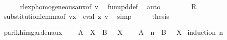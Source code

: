 \begin{isabellebody}
\ \ \ \ \isamarkupfalse%
\ rlexp{\isacharunderscore}{\kern0pt}homogeneous{\isacharunderscore}{\kern0pt}aux{\isacharbrackleft}{\kern0pt}of\ {\isacharquery}{\kern0pt}v{\isacharprime}{\kern0pt}{\isacharbrackright}{\kern0pt}\ \isamarkupfalse%
\ fun{\isacharunderscore}{\kern0pt}upd{\isacharunderscore}{\kern0pt}def\ \isamarkupfalse%
\ auto\isanewline
\ \ \isamarkupfalse%
\ \isamarkupfalse%
\ {\isachardoublequoteopen}{\isasymdots}\ {\isacharequal}{\kern0pt}\ {\isasymPsi}\ {\isacharquery}{\kern0pt}R{\isachardoublequoteclose}\ \isamarkupfalse%
\ substitution{\isacharunderscore}{\kern0pt}lemma{\isacharbrackleft}{\kern0pt}of\ {\isachardoublequoteopen}v{\isacharparenleft}{\kern0pt}x\ {\isacharcolon}{\kern0pt}{\isacharequal}{\kern0pt}\ eval\ z\ v{\isacharparenright}{\kern0pt}{\isachardoublequoteclose}{\isacharbrackright}{\kern0pt}\ \isamarkupfalse%
\ simp\isanewline
\ \ \isamarkupfalse%
\ \isamarkupfalse%
\ {\isacharquery}{\kern0pt}thesis\ \isakeywordONE{{\isachardot}{\kern0pt}}\isamarkupfalse%
\isanewline
{}\isamarkupfalse%
%
\endisatagproof
{\isafoldproof}%
%
\isadelimproof
%
\endisadelimproof
%
\isadelimdocument
%
\endisadelimdocument
%
\isatagdocument
%
\isamarkuptrue%
%
\endisatagdocument
{\isafolddocument}%
%
\isadelimdocument
%
\endisadelimdocument
%
\begin{isamarkuptext}%
\label{sec:parikh_arden}%
\end{isamarkuptext}\isamarkuptrue%
\isamarkupfalse%
\ parikh{\isacharunderscore}{\kern0pt}img{\isacharunderscore}{\kern0pt}arden{\isacharunderscore}{\kern0pt}aux{\isacharcolon}{\kern0pt}\isanewline
\ \ \ {\isachardoublequoteopen}{\isasymPsi}\ {\isacharparenleft}{\kern0pt}A\ {\isacharat}{\kern0pt}{\isacharat}{\kern0pt}\ X\ {\isasymunion}\ B{\isacharparenright}{\kern0pt}\ {\isasymsubseteq}\ {\isasymPsi}\ X{\isachardoublequoteclose}\isanewline
\ \ \ {\isachardoublequoteopen}{\isasymPsi}\ {\isacharparenleft}{\kern0pt}A\ {\isacharcircum}{\kern0pt}{\isacharcircum}{\kern0pt}\ n\ {\isacharat}{\kern0pt}{\isacharat}{\kern0pt}\ B{\isacharparenright}{\kern0pt}\ {\isasymsubseteq}\ {\isasymPsi}\ X{\isachardoublequoteclose}\isanewline
%
\isadelimproof
%
\endisadelimproof
%
\isatagproof
{}\isamarkupfalse%
\ {\isacharparenleft}{\kern0pt}induction\ n{\isacharparenright}{\kern0pt}\isanewline

\end{isabellebody}
